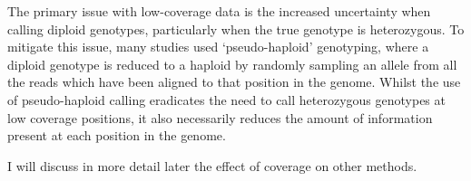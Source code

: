 The primary issue with low-coverage data is the increased uncertainty when calling diploid genotypes, particularly when the true genotype is heterozygous. To mitigate this issue, many studies used `pseudo-haploid' genotyping, where a diploid genotype is reduced to a haploid by randomly sampling an allele from all the reads which have been aligned to that position in the genome. Whilst the use of pseudo-haploid calling eradicates the need to call heterozygous genotypes at low coverage positions, it also necessarily reduces the amount of information present at each position in the genome.

I will discuss in more detail later the effect of coverage on other methods. 
 
